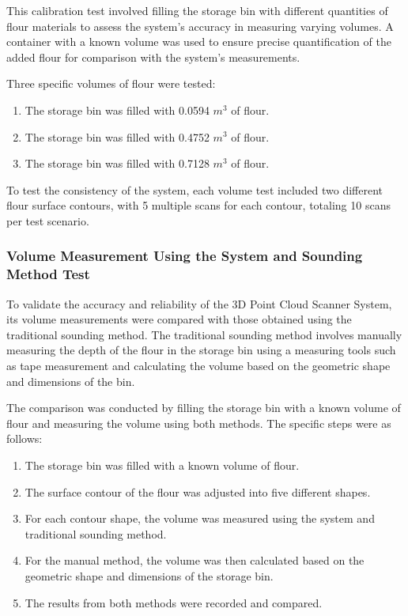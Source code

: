 This calibration test involved filling the storage bin with different quantities of flour materials to assess the system's accuracy in measuring varying volumes. A container with a known volume was used to ensure precise quantification of the added flour for comparison with the system's measurements.

Three specific volumes of flour were tested:
\begin{enumerate}
	\item The storage bin was filled with 0.0594 $m^3$ of flour.
	\item The storage bin was filled with 0.4752 $m^3$ of flour.
	\item The storage bin was filled with 0.7128 $m^3$ of flour.
\end{enumerate}

To test the consistency of the system, each volume test included two different flour surface contours, with 5 multiple scans for each contour, totaling 10 scans per test scenario.

\subsubsection{Volume Measurement Using the System and Sounding Method Test}
To validate the accuracy and reliability of the 3D Point Cloud Scanner System, its volume measurements were compared with those obtained using the traditional sounding method. The traditional sounding method involves manually measuring the depth of the flour in the storage bin using a measuring tools such as tape measurement and calculating the volume based on the geometric shape and dimensions of the bin.

The comparison was conducted by filling the storage bin with a known volume of flour and measuring the volume using both methods. The specific steps were as follows:
\begin{enumerate}
	\item The storage bin was filled with a known volume of flour.
	\item The surface contour of the flour was adjusted into five different shapes.
	\item For each contour shape, the volume was measured using the system and traditional sounding method.
	\item For the manual method, the volume was then calculated based on the geometric shape and dimensions of the storage bin.
	\item The results from both methods were recorded and compared.
\end{enumerate}

